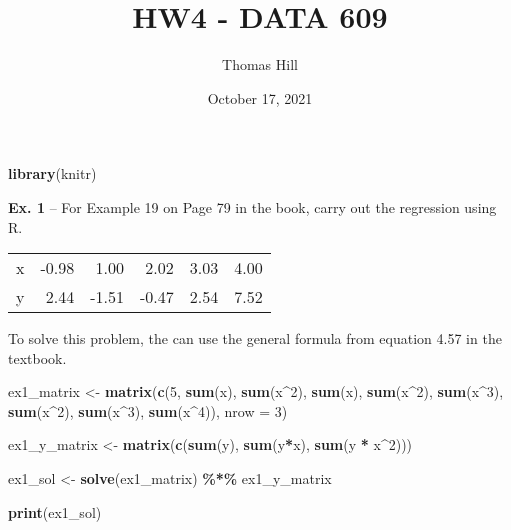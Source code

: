 \documentclass[
]{article}
\title{HW4 - DATA 609}
\author{Thomas Hill}
\date{October 17, 2021}
\newenvironment{Shaded}{\begin{snugshade}}{\end{snugshade}}
\newcommand{\DataTypeTok}[1]{\textcolor[rgb]{0.13,0.29,0.53}{#1}}
\newcommand{\DecValTok}[1]{\textcolor[rgb]{0.00,0.00,0.81}{#1}}
\newcommand{\KeywordTok}[1]{\textcolor[rgb]{0.13,0.29,0.53}{\textbf{#1}}}
\newcommand{\NormalTok}[1]{#1}
\newcommand{\OperatorTok}[1]{\textcolor[rgb]{0.81,0.36,0.00}{\textbf{#1}}}
\newcommand{\StringTok}[1]{\textcolor[rgb]{0.31,0.60,0.02}{#1}}
\begin{document}
\maketitle

\begin{Shaded}
\begin{Highlighting}[]
\KeywordTok{library}\NormalTok{(knitr)}
\end{Highlighting}
\end{Shaded}

\textbf{Ex. 1} -- For Example 19 on Page 79 in the book, carry out the
regression using R.

\begin{longtable}[]{@{}lrrrrr@{}}
\toprule
\endhead
x & -0.98 & 1.00 & 2.02 & 3.03 & 4.00\tabularnewline
y & 2.44 & -1.51 & -0.47 & 2.54 & 7.52\tabularnewline
\bottomrule
\end{longtable}

To solve this problem, the can use the general formula from equation
4.57 in the textbook.

\begin{Shaded}
\begin{Highlighting}[]
\NormalTok{ex1\_matrix \textless{}{-}}\StringTok{ }\KeywordTok{matrix}\NormalTok{(}\KeywordTok{c}\NormalTok{(}\DecValTok{5}\NormalTok{, }\KeywordTok{sum}\NormalTok{(x), }\KeywordTok{sum}\NormalTok{(x}\OperatorTok{\^{}}\DecValTok{2}\NormalTok{), }\KeywordTok{sum}\NormalTok{(x), }\KeywordTok{sum}\NormalTok{(x}\OperatorTok{\^{}}\DecValTok{2}\NormalTok{), }\KeywordTok{sum}\NormalTok{(x}\OperatorTok{\^{}}\DecValTok{3}\NormalTok{), }\KeywordTok{sum}\NormalTok{(x}\OperatorTok{\^{}}\DecValTok{2}\NormalTok{), }\KeywordTok{sum}\NormalTok{(x}\OperatorTok{\^{}}\DecValTok{3}\NormalTok{), }\KeywordTok{sum}\NormalTok{(x}\OperatorTok{\^{}}\DecValTok{4}\NormalTok{)), }\DataTypeTok{nrow =} \DecValTok{3}\NormalTok{)}

\NormalTok{ex1\_y\_matrix \textless{}{-}}\StringTok{ }\KeywordTok{matrix}\NormalTok{(}\KeywordTok{c}\NormalTok{(}\KeywordTok{sum}\NormalTok{(y), }\KeywordTok{sum}\NormalTok{(y}\OperatorTok{*}\NormalTok{x), }\KeywordTok{sum}\NormalTok{(y }\OperatorTok{*}\StringTok{ }\NormalTok{x}\OperatorTok{\^{}}\DecValTok{2}\NormalTok{)))}




\NormalTok{ex1\_sol \textless{}{-}}\StringTok{ }\KeywordTok{solve}\NormalTok{(ex1\_matrix) }\OperatorTok{\%*\%}\StringTok{ }\NormalTok{ex1\_y\_matrix}

\KeywordTok{print}\NormalTok{(ex1\_sol)}
\end{Highlighting}
\end{Shaded}
\end{document}
